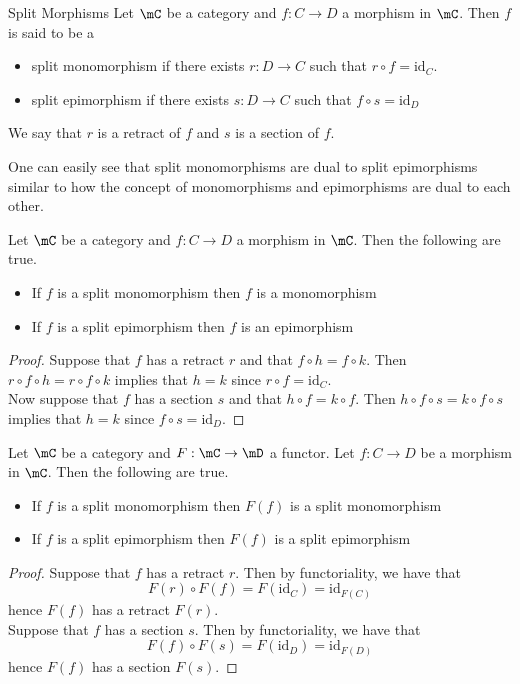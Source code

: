 \documentclass[a4paper]{article}
\begin{document}
\begin{defn}{Split Morphisms}{} Let $\mC$ be a category and $f:C\to D$ a morphism in $\mC$. Then $f$ is said to be a 
\begin{itemize}
\item split monomorphism if there exists $r:D\to C$ such that $r\circ f=\text{id}_C$. 
\item split epimorphism if there exists $s:D\to C$ such that $f\circ s=\text{id}_D$
\end{itemize}
We say that $r$ is a retract of $f$ and $s$ is a section of $f$. 
\end{defn}

One can easily see that split monomorphisms are dual to split epimorphisms similar to how the concept of monomorphisms and epimorphisms are dual to each other. 

\begin{prp}{}{} Let $\mC$ be a category and $f:C\to D$ a morphism in $\mC$. Then the following are true. 
\begin{itemize}
\item If $f$ is a split monomorphism then $f$ is a monomorphism
\item If $f$ is a split epimorphism then $f$ is an epimorphism
\end{itemize} 
\begin{proof}
Suppose that $f$ has a retract $r$ and that $f\circ h=f\circ k$. Then $r\circ f\circ h=r\circ f\circ k$ implies that $h=k$ since $r\circ f=\text{id}_C$. \\

Now suppose that $f$ has a section $s$ and that $h\circ f=k\circ f$. Then $h\circ f\circ s=k\circ f\circ s$ implies that $h=k$ since $f\circ s=\text{id}_D$. 
\end{proof}
\end{prp}

\begin{prp}{}{} Let $\mC$ be a category and $F:\mC\to\mD$ a functor. Let $f:C\to D$ be a morphism in $\mC$. Then the following are true. 
\begin{itemize}
\item If $f$ is a split monomorphism then $F(f)$ is a split monomorphism
\item If $f$ is a split epimorphism then $F(f)$ is a split epimorphism
\end{itemize} 
\begin{proof}
Suppose that $f$ has a retract $r$. Then by functoriality, we have that $$F(r)\circ F(f)=F(\text{id}_C)=\text{id}_{F(C)}$$ hence $F(f)$ has a retract $F(r)$. \\

Suppose that $f$ has a section $s$. Then by functoriality, we have that $$F(f)\circ F(s)=F(\text{id}_D)=\text{id}_{F(D)}$$ hence $F(f)$ has a section $F(s)$. 
\end{proof}
\end{prp}
\end{document}
